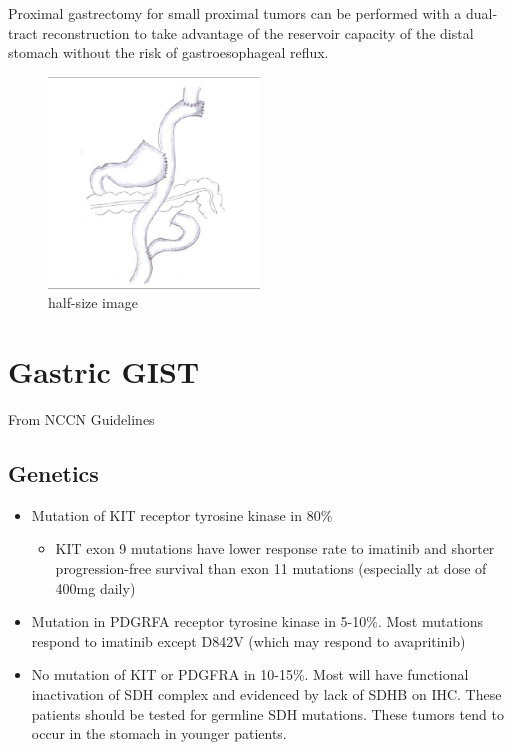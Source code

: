 \documentclass[
]{book}
\providecommand{\tightlist}{%
  \setlength{\itemsep}{0pt}\setlength{\parskip}{0pt}}
\begin{document}
Proximal gastrectomy for small proximal tumors can be performed with a dual-tract reconstruction to take advantage of the reservoir capacity of the distal stomach without the risk of gastroesophageal reflux.

\begin{figure}
\hypertarget{id}{%
\centering
\includegraphics[width=0.5\textwidth,height=0.5\textheight]{images/Double-tract_Q640.jpg}
\caption{half-size image}\label{id}
}
\end{figure}

\hypertarget{gastric-gist}{%
\chapter{Gastric GIST}\label{gastric-gist}}

From NCCN Guidelines

\hypertarget{genetics}{%
\section{Genetics}\label{genetics}}

\begin{itemize}
\tightlist
\item
  Mutation of KIT receptor tyrosine kinase in 80\%

  \begin{itemize}
  \tightlist
  \item
    KIT exon 9 mutations have lower response rate to imatinib and shorter progression-free survival than exon 11 mutations (especially at dose of 400mg daily)
  \end{itemize}
\item
  Mutation in PDGRFA receptor tyrosine kinase in 5-10\%. Most mutations respond to imatinib except D842V (which may respond to avapritinib)
\item
  No mutation of KIT or PDGFRA in 10-15\%. Most will have functional inactivation of SDH complex and evidenced by lack of SDHB on IHC. These patients should be tested for germline SDH mutations. These tumors tend to occur in the stomach in younger patients.
\end{itemize}
\end{document}
